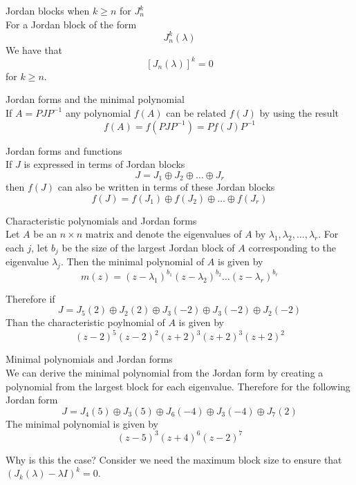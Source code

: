 \documentclass[journal, letterpaper]{IEEEtran}
\begin{document}
    \begin{mybox}{Jordan blocks when $k \ge n$ for $J_n^k$} \\
        For a Jordan block of the form
        $$ J_n^k(\lambda)$$
        We have that
        $$ [J_n(\lambda)]^k = 0$$
        for $k \ge n$.
    \end{mybox}
    \begin{myboxr}{Jordan forms and the minimal polynomial} \\ 
        If $A = PJP^{-1}$ any polynomial $f(A)$ can be related $f(J)$ by using the result
        $$ f(A) = f(PJP^{-1}) = Pf(J)P^{-1}$$
    \end{myboxr}
    \begin{mybox}{Jordan forms and functions} \\ 
        If $J$ is expressed in terms of Jordan blocks
        $$ J = J_1 \oplus J_2 \oplus \dots \oplus J_r$$
        then $f(J)$ can also be written in terms of these Jordan blocks
        $$ f(J) = f(J_1) \oplus f(J_2) \oplus \dots \oplus f(J_r) $$
    \end{mybox}
    \begin{myboxr}{Characteristic polynomials and Jordan forms} \\ 
    Let $A$ be an $n \times n$ matrix and denote the eigenvalues of $A$ by $\lambda_1, \lambda_2, \dots, \lambda_r$. For each $j$, let $b_j$ be the size of the largest Jordan block of $A$ 
    corresponding to the eigenvalue $\lambda_j$. Then the minimal polynomial of $A$ is given 
    by
    $$ m(z) = (z-\lambda_1)^{b_1}(z - \lambda_2)^{b_2}\dots(z-\lambda_r)^{b_r}$$
    
    Therefore if
    $$ J = J_5(2) \oplus J_2(2) \oplus J_3(-2) \oplus J_3(-2) \oplus J_2(-2)$$
    Than the characteristic poylnomial of $A$ is given by
    $$ (z-2)^5(z-2)^2(z+2)^3(z+2)^3(z+2)^2$$
    \end{myboxr}
    \begin{mybox}{Minimal polynomials and Jordan forms} \\ 
        We can derive the minimal polynomial from the Jordan form by creating a polynomial from the largest block for each 
        eigenvalue. Therefore for the following Jordan form
        $$ J = J_4(5) \oplus J_3(5) \oplus J_6(-4) \oplus J_3(-4) \oplus J_7(2) $$
        The minimal polynomial is given by
        $$ (z-5)^3(z + 4)^6(z -2)^7$$

        Why is this the case? Consider we need the maximum block size to ensure that $(J_k(\lambda) - \lambda I)^k = 0$.
    \end{mybox}
\end{document}
